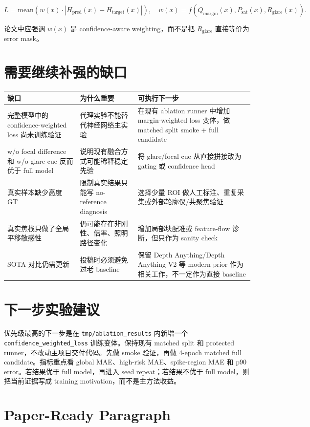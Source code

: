 \documentclass[11pt]{article}
\begin{document}
\[
L=\mathrm{mean}\left(w(x)\cdot |H_{\mathrm{pred}}(x)-H_{\mathrm{target}}(x)|\right),\quad
w(x)=f(Q_{\mathrm{margin}}(x),P_{\mathrm{sat}}(x),R_{\mathrm{glare}}(x)).
\]

论文中应强调 $w(x)$ 是 confidence-aware weighting，而不是把 $R_{\mathrm{glare}}$ 直接等价为 error mask。

\section{需要继续补强的缺口}

\small
\begin{tabularx}{\linewidth}{Y Y Y}
\toprule
缺口 & 为什么重要 & 可执行下一步 \\
\midrule
完整模型中的 confidence-weighted loss 尚未训练验证 & 代理实验不能替代神经网络主实验 & 在现有 ablation runner 中增加 margin-weighted loss 变体，做 matched split smoke + full candidate \\
w/o focal difference 和 w/o glare cue 反而优于 full model & 说明现有融合方式可能稀释稳定先验 & 将 glare/focal cue 从直接拼接改为 gating 或 confidence head \\
真实样本缺少高度 GT & 限制真实结果只能写 no-reference diagnosis & 选择少量 ROI 做人工标注、重复采集或外部轮廓仪/共聚焦验证 \\
真实焦栈只做了全局平移敏感性 & 仍可能存在非刚性、倍率、照明路径变化 & 增加局部块配准或 feature-flow 诊断，但只作为 sanity check \\
SOTA 对比仍需更新 & 投稿时必须避免过老 baseline & 保留 Depth Anything/Depth Anything V2 等 modern prior 作为相关工作，不一定作为直接 baseline \\
\bottomrule
\end{tabularx}
\normalsize

\section{下一步实验建议}

优先级最高的下一步是在 \texttt{tmp/ablation\_results} 内新增一个 \texttt{confidence\_weighted\_loss} 训练变体。保持现有 matched split 和 protected runner，不改动主项目交付代码。先做 smoke 验证，再做 4-epoch matched full candidate。指标重点看 global MAE、high-risk MAE、spike-region MAE 和 p90 error。若结果优于 full model，再进入 seed repeat；若结果不优于 full model，则把当前证据写成 training motivation，而不是主方法收益。

\section{Paper-Ready Paragraph}
\end{document}
